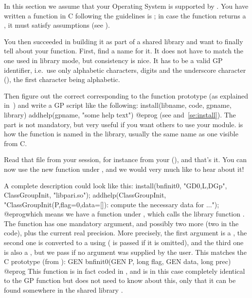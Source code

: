 In this section we assume that your Operating System is supported by
. You have written a function in C following the guidelines is
; in case the function returns a , it
must satisfy  assumptions (see ).

You then succeeded in building it as part of a shared library and want to
finally tell  about your function. First, find a name for it. It does
not have to match the one used in library mode, but consistency is nice. It
has to be a valid GP identifier, i.e.~use only alphabetic characters, digits
and the underscore character (\kbd{\_}), the first character being
alphabetic.

Then figure out the correct  corresponding to the function
prototype (as explained in~) and write a GP script
like the following:
\bprog
install(libname, code, gpname, library)
addhelp(gpname, "some help text")
@eprog
\noindent(see  and~\ref{se:install}). The 
part is not mandatory, but very useful if you want others to use your
module.  is how the function is named in the library,
usually the same name as one visible from C.

Read that file from your  session, for instance from your
 (), and that's it. You
can now use the new function  under , and we would very
much like to hear about it! \smallskip

A complete description could look like this:
\bprog
{
  install(bnfinit0, "GD0,L,DGp", ClassGroupInit, "libpari.so");
  addhelp(ClassGroupInit, "ClassGroupInit(P,{flag=0},{data=[]}):
    compute the necessary data for ...");
}
@eprog\noindent which means we have a function  under
, which calls the library function  . The function has
one mandatory argument, and possibly two more (two  in the code),
plus the current real precision. More precisely, the first argument is a
, the second one is converted to a  using 
( is passed if it is omitted), and the third one is also a ,
but we pass  if no argument was supplied by the user. This matches
the C prototype (from ):
%
\bprog
  GEN bnfinit0(GEN P, long flag, GEN data, long prec)
@eprog\noindent
This function is in fact coded in , and is in this case
completely identical to the GP function  but  does not
need to know about this, only that it can be found somewhere in the shared
library .

